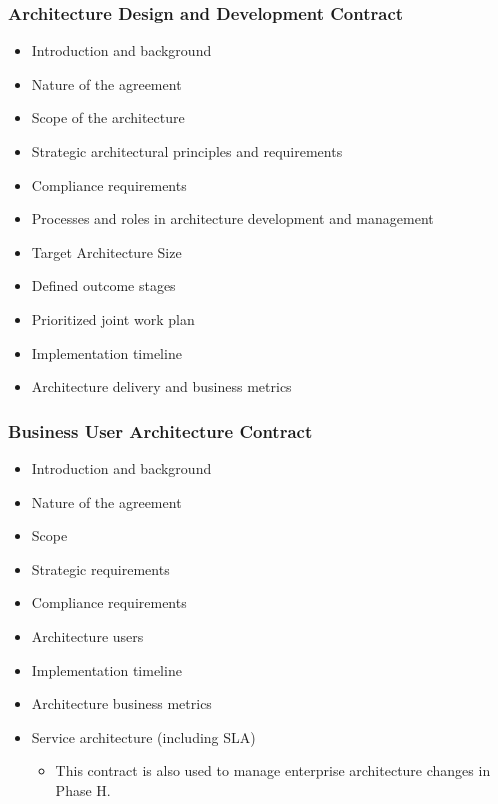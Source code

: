 \documentclass[aspectratio=169, table]{beamer}
\begin{document}
\begin{frame}
	\frametitle{\LARGE{Architecture Design and Development Contract}}
	
	\begin{itemize}
		\item Introduction and background
		\item Nature of the agreement
		\item Scope of the architecture
		\item Strategic architectural principles and requirements
		\item Compliance requirements
		\item Processes and roles in architecture development and management
		\item Target Architecture Size
		\item Defined outcome stages
		\item Prioritized joint work plan
		\item Implementation timeline
		\item Architecture delivery and business metrics
	\end{itemize}
\end{frame}

\begin{frame}
	\frametitle{Business User Architecture Contract}
	\vspace{15pt}
	\begin{itemize}
		\item Introduction and background
		\item Nature of the agreement
		\item Scope
		\item Strategic requirements
		\item Compliance requirements
		\item Architecture users
		\item Implementation timeline
		\item Architecture business metrics
		\item Service architecture (including SLA)
		\begin{itemize}
			\item This contract is also used to manage enterprise architecture changes in Phase H.
		\end{itemize}
	\end{itemize}
\end{frame}
\end{document}
